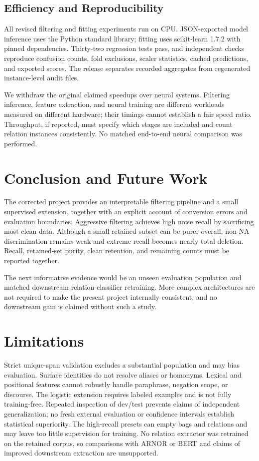 \documentclass[11pt]{article}
\begin{document}
\subsection{Efficiency and Reproducibility}
All revised filtering and fitting experiments run on CPU. JSON-exported model inference uses the Python standard library; fitting uses scikit-learn 1.7.2 with pinned dependencies. Thirty-two regression tests pass, and independent checks reproduce confusion counts, fold exclusions, scaler statistics, cached predictions, and exported scores. The release separates recorded aggregates from regenerated instance-level audit files.

We withdraw the original claimed speedups over neural systems. Filtering inference, feature extraction, and neural training are different workloads measured on different hardware; their timings cannot establish a fair speed ratio. Throughput, if reported, must specify which stages are included and count relation instances consistently. No matched end-to-end neural comparison was performed.

\section{Conclusion and Future Work}
The corrected project provides an interpretable filtering pipeline and a small supervised extension, together with an explicit account of conversion errors and evaluation boundaries. Aggressive filtering achieves high noise recall by sacrificing most clean data. Although a small retained subset can be purer overall, non-NA discrimination remains weak and extreme recall becomes nearly total deletion. Recall, retained-set purity, clean retention, and remaining counts must be reported together.

The next informative evidence would be an unseen evaluation population and matched downstream relation-classifier retraining. More complex architectures are not required to make the present project internally consistent, and no downstream gain is claimed without such a study.

\section*{Limitations}
Strict unique-span validation excludes a substantial population and may bias evaluation. Surface identities do not resolve aliases or homonyms. Lexical and positional features cannot robustly handle paraphrase, negation scope, or discourse. The logistic extension requires labeled examples and is not fully training-free. Repeated inspection of dev/test prevents claims of independent generalization; no fresh external evaluation or confidence intervals establish statistical superiority. The high-recall presets can empty bags and relations and may leave too little supervision for training. No relation extractor was retrained on the retained corpus, so comparisons with ARNOR or BERT and claims of improved downstream extraction are unsupported.
\end{document}
